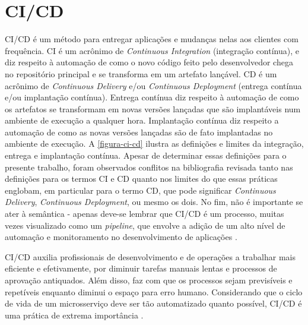 \section{CI/CD}
CI/CD é um método para entregar aplicações e mudanças nelas aos clientes com frequência. CI é um acrônimo de \emph{Continuous Integration} (integração contínua), e diz respeito à automação de como o novo código feito pelo desenvolvedor chega no repositório principal e se transforma em um artefato lançável. CD é um acrônimo de \emph{Continuous Delivery} e/ou \emph{Continuous Deployment} (entrega contínua e/ou implantação contínua). Entrega contínua diz respeito à automação de como os artefatos se transformam em novas versões lançadas que são implantáveis num ambiente de execução a qualquer hora. Implantação contínua diz respeito a automação de como as novas versões lançadas são de fato implantadas no ambiente de execução. A \autoref{figura-ci-cd} ilustra as definições e limites da integração, entrega e implantação contínua. Apesar de determinar essas definições para o presente trabalho, foram observados conflitos na bibliografia revisada tanto nas definições para os termos CI e CD quanto nos limites do que essas práticas englobam, em particular para o termo CD, que pode significar \emph{Continuous Delivery}, \emph{Continuous Deployment}, ou mesmo os dois. No fim, não é importante se ater à semântica - apenas deve-se lembrar que CI/CD é um processo, muitas vezes visualizado como um \emph{pipeline}, que envolve a adição de um alto nível de automação e monitoramento no desenvolvimento de aplicações \cite{redhat-ci-cd, harness-ci-cd, gitlab-ci-cd}.

CI/CD auxilia profissionais de desenvolvimento e de operações a trabalhar mais eficiente e efetivamente, por diminuir tarefas manuais lentas e processos de aprovação antiquados. Além disso, faz com que os processos sejam previsíveis e repetíveis enquanto diminui o espaço para erro humano. Considerando que o ciclo de vida de um microsserviço deve ser tão automatizado quanto possível, CI/CD é uma prática de extrema importância \cite{gitlab-ci-cd}.

